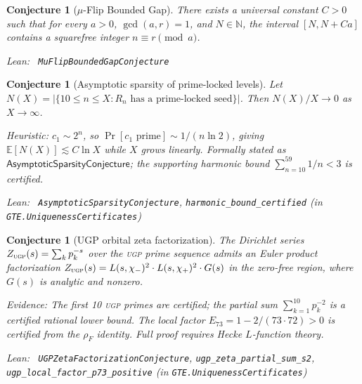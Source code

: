 \documentclass[11pt,a4paper]{article}
\newenvironment{leanref}%
  {\par\smallskip\noindent\begingroup\raggedright\textup{Lean:}~}%
  {\par\endgroup}
\newtheorem{conjecture}[theorem]{Conjecture}
\theoremstyle{definition}
\newcommand{\ugp}{\textsc{ugp}}
\newcommand{\N}{\mathbb{N}}
\begin{document}
\begin{conjecture}[$\mu$-Flip Bounded Gap]\label{conj:mu-flip-gap}
There exists a universal constant $C > 0$ such that for every
$a > 0$, $\gcd(a,r) = 1$, and $N \in \N$, the interval $[N, N + Ca]$
contains a squarefree integer $n \equiv r \pmod{a}$.

\begin{leanref} \lstinline|MuFlipBoundedGapConjecture|
\end{leanref}
\end{conjecture}

\begin{conjecture}[Asymptotic sparsity of prime-locked levels]\label{conj:sparsity}
Let $N(X) = |\{10 \le n \le X : R_n \text{ has a prime-locked seed}\}|$.
Then $N(X)/X \to 0$ as $X \to \infty$.

\smallskip\noindent
\emph{Heuristic:} $c_1 \sim 2^n$, so $\Pr[c_1 \text{ prime}] \sim 1/(n\ln 2)$,
giving $\mathbb{E}[N(X)] \lesssim C\ln X$ while $X$ grows linearly.
Formally stated as $\mathsf{AsymptoticSparsityConjecture}$; the supporting
harmonic bound $\sum_{n=10}^{59} 1/n < 3$ is certified.

\begin{leanref} \lstinline|AsymptoticSparsityConjecture|,
\lstinline|harmonic_bound_certified|
\textup{(in \texttt{GTE.UniquenessCertificates})}
\end{leanref}
\end{conjecture}

\begin{conjecture}[UGP orbital zeta factorization]\label{conj:zeta}
The Dirichlet series $Z_{\text{\ugp{}}}(s) = \sum_k p_k^{-s}$ over the \ugp{} prime
sequence admits an Euler product factorization
$Z_{\text{\ugp{}}}(s) = L(s,\chi_-)^2 \cdot L(s,\chi_+)^2 \cdot G(s)$
in the zero-free region, where $G(s)$ is analytic and nonzero.

\smallskip\noindent
\emph{Evidence:} The first 10 \ugp{} primes are certified; the partial sum
$\sum_{k=1}^{10} p_k^{-2}$ is a certified rational lower bound.
The local factor $E_{73} = 1 - 2/(73 \cdot 72) > 0$ is certified from the
$\rho_F$ identity. Full proof requires Hecke $L$-function theory.

\begin{leanref} \lstinline|UGPZetaFactorizationConjecture|,
\lstinline|ugp_zeta_partial_sum_s2|,
\lstinline|ugp_local_factor_p73_positive|
\textup{(in \texttt{GTE.UniquenessCertificates})}
\end{leanref}
\end{conjecture}
\end{document}
